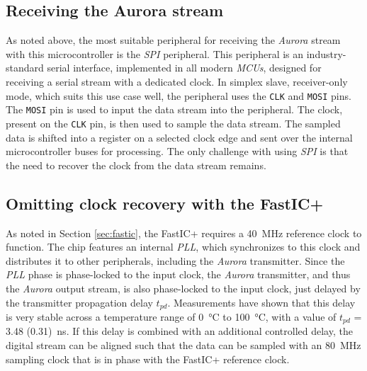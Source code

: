 \subsection{Receiving the Aurora stream}
\label{sec:aurora_sampling}
As noted above, the most suitable peripheral for receiving the \emph{Aurora} stream with this microcontroller is the \emph{SPI} peripheral. This peripheral is an industry-standard serial interface, implemented in all modern \textit{MCUs}, designed for receiving a serial stream with a dedicated clock. In simplex slave, receiver-only mode, which suits this use case well, the peripheral uses the \verb|CLK| and \verb|MOSI| pins. The \verb|MOSI| pin is used to input the data stream into the peripheral. The clock, present on the \verb|CLK| pin, is then used to sample the data stream. The sampled data is shifted into a register on a selected clock edge and sent over the internal microcontroller buses for processing. \cite{stm32h753xih6_ref_manual} The only challenge with using \emph{SPI} is that the need to recover the clock from the data stream remains.

\subsection{Omitting clock recovery with the FastIC+}
As noted in Section \ref{sec:fastic}, the FastIC+ requires a \SI{40}{\mega\hertz} reference clock to function. The chip features an internal \emph{PLL}, which synchronizes to this clock and distributes it to other peripherals, including the \emph{Aurora} transmitter. Since the \emph{PLL} phase is phase-locked to the input clock, the \emph{Aurora} transmitter, and thus the \emph{Aurora} output stream, is also phase-locked to the input clock, just delayed by the transmitter propagation delay $t_{pd}$. \cite{ficDatasheet} Measurements have shown that this delay is very stable across a temperature range of \SI{0}{\celsius} to \SI{100}{\celsius}, with a value of $t_{pd}$ = \SI{3.48 (0.31)}{\nano\second}. \cite{Vosahlo2024} If this delay is combined with an additional controlled delay, the digital stream can be aligned such that the data can be sampled with an \SI{80}{\mega\hertz} sampling clock that is in phase with the FastIC+ reference clock.


